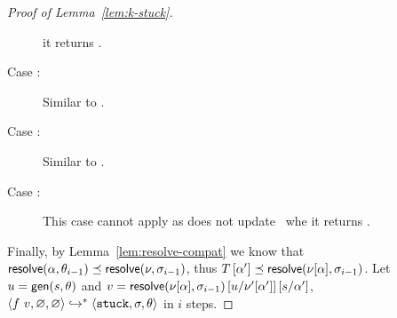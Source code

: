 \begin{proof}[Proof of Lemma~\ref{lem:k-stuck}]
\begin{description}
      it returns \stuck.
    \item[Case \renodebadtwo:]
      Similar to \renodegood.
    \item[Case \rulename{E-Case-Good\{1,2\}}:]
      Similar to \replusgood.
    \item[Case \recasebad:]
      This case cannot apply as \forcesym does not update \tsu\ whe
      it returns \stuck.
    \end{description}
  Finally, by Lemma~\ref{lem:resolve-compat} we know that
  $\vsub{\resolve{\thole}{\tsu_{i-1}}}{\resolve{\ehole}{\vsu_{i-1}}}$,
  thus $\vsub{\intctx{\thole'}}{\resolve{\vhole{\thole}}{\vsu_{i-1}}}$.
  Let $u = \gen{s}{\tsu}$
  and $v = \resolve{\vhole{\thole}}{\vsu_{i-1}}\sub{\ehole'[\thole']}{u}\sub{\thole'}{s}$,
  $\steps{\eapp{f}{v}}{\emptysu}{\emptysu}{\stuck}{\vsu}{\tsu}$ in $i$ steps.


\end{proof}
